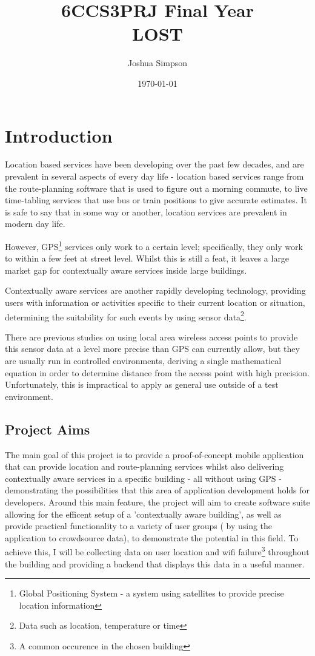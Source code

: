 \documentclass[11pt]{informatics-report}
\title{6CCS3PRJ Final Year\\\vspace{0.2cm} LOST}
\author{Joshua Simpson}
\date{\today}
\begin{document}
\createFrontMatter
\onehalfspacing
\tableofcontents
\doublespacing


\chapter{Introduction}
Location based services have been developing over the past few decades, and are prevalent in several aspects of every day life - location based services range from the route-planning software that is used to figure out a morning commute, to live time-tabling services that use bus or train positions to give accurate estimates. It is safe to say that in some way or another, location services are prevalent in modern day life.

However, GPS\footnote{ Global Positioning System - a system using satellites to provide precise location information} services only work to a certain level;  specifically, they only work to within a few feet at street level\cite{cook2005indoor}. Whilst this is still a feat, it leaves a large market gap for contextually aware services inside large buildings. 

Contextually aware services are another rapidly developing technology, providing users with information or activities specific to their current location or situation, determining the suitability for such events by using sensor data\footnote{ Data such as location, temperature or time }. 

There are previous studies on using local area wireless access points to provide this sensor data at a level more precise than GPS can currently allow, but they are usually run in controlled environments, deriving a single mathematical equation in order to determine distance from the access point with high precision\cite{996891}. Unfortunately, this is impractical to apply as general use outside of a test environment.
\newline \newline 


\section{Project Aims}

The main goal of this project is to provide a proof-of-concept mobile application that can provide location and route-planning services whilst also delivering contextually aware services in a specific building - all without using GPS - demonstrating the possibilities that this area of application development holds for developers. Around this main feature, the project will aim to create software suite allowing for the efficent setup of a 'contextually aware building', as well as provide practical functionality to a variety of user groups ( by using the application to crowdsource data), to demonstrate the potential in this field. To achieve this, I will be collecting data on user location and wifi failure\footnote{A common occurence in the chosen building} throughout the building and providing a backend that displays this data in a useful manner.
\end{document}
